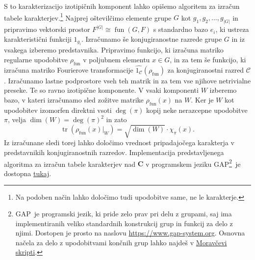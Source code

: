 \documentclass[11pt]{book}
\def\CC{\mathbf{C}}
\def\conclass{\mathcal{C}}
\DeclareMathOperator\tr{tr}
\DeclareMathOperator\fun{fun}
\theoremstyle{definition}
\theoremstyle{zgled}
\theoremstyle{zgledbrezstevilke}
\theoremstyle{odprtproblem}
\theoremstyle{domacanaloga}
\theoremstyle{izrek}
\begin{document}
S to karakterizacijo izotipičnih komponent lahko opišemo algoritem za izračun tabele karakterjev.\footnote{Na podoben način lahko določimo tudi upodobitve same, ne le karakterje.} Najprej oštevilčimo elemente grupe $G$ kot $g_1, g_2, \dots, g_{|G|}$ in pripravimo vektorski prostor $F^{|G|} \cong \fun(G,F)$ s standardno bazo $e_i$, ki ustreza karakteristični funkciji $1_{g_i}$. Izračunamo še konjugiranostne razrede grupe $G$ in iz vsakega izberemo predstavnika. Pripravimo funkcijo, ki izračuna matriko regularne upodobitve $\rho_{\fun}$ v poljubnem elementu $x \in G$, in za tem še funkcijo, ki izračuna matriko Fourierove transformacije $\widehat{1_{\conclass}}(\rho_{\fun})$ za konjugiranostni razred $\conclass$. Izračunamo lastne podprostore vseh teh matrik in za tem vse njihove netrivialne preseke. Te so ravno izotipične komponente. V vsaki komponenti $W$ izberemo bazo, v kateri izračunamo sled zožitve matrike $\rho_{\fun}(x)$ na $W$. Ker je $W$ kot upodobitev izomorfen direktni vsoti $\deg(\pi)$ kopij neke nerazcepne upodobitve $\pi$, velja $\dim(W) = \deg(\pi)^2$ in zato
\[
    \tr(\rho_{\fun}(x) |_W) = \sqrt{\dim(W)} \cdot \chi_{\pi}(x).
\]
Iz izračunane sledi torej lahko določimo vrednost pripadajočega karakterja v predstavnikih konjugiranostnih razredov. Implementacija predstavljenega algoritma za izračun tabele karakterjev nad $\CC$ v programskem jeziku GAP\footnote{GAP~je programski jezik, ki pride zelo prav pri delu z grupami, saj ima implementiranih veliko standardnih konstrukcij grup in funkcij za delo z njimi. Dostopen je prosto na naslovu \url{https://www.gap-system.org}. Osnovna načela za delo z upodobitvami končnih grup lahko najdeš v \href{https://users.fmf.uni-lj.si/moravec/Papers/upodob_moravec.pdf}{Moravčevi skripti}.}~je dostopna \href{https://github.com/urbanjezernik/teorija-upodobitev/blob/main/racunanje-tabele.g}{tukaj}.
\end{document}
